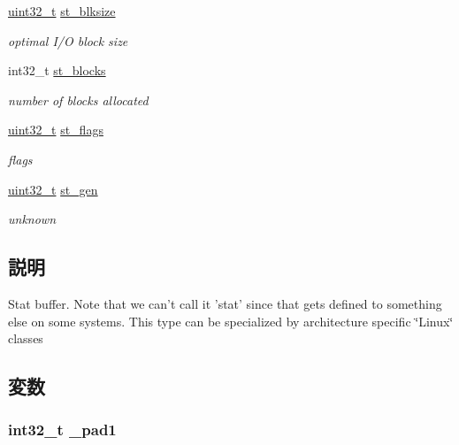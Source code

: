 \begin{DoxyCompactItemize}
\hyperlink{Type_8hh_a435d1572bf3f880d55459d9805097f62}{uint32\_\-t} \hyperlink{structLinux_1_1tgt__stat_a952cc52eb5efd16f9cebffe863823593}{st\_\-blksize}
\begin{DoxyCompactList}\small\item\em optimal I/O block size \item\end{DoxyCompactList}\item 
int32\_\-t \hyperlink{structLinux_1_1tgt__stat_a9bdc90ebe5192856e17c3ad67c0cb140}{st\_\-blocks}
\begin{DoxyCompactList}\small\item\em number of blocks allocated \item\end{DoxyCompactList}\item 
\hyperlink{Type_8hh_a435d1572bf3f880d55459d9805097f62}{uint32\_\-t} \hyperlink{structLinux_1_1tgt__stat_a2bac91973217293ac3be9cd5f402a819}{st\_\-flags}
\begin{DoxyCompactList}\small\item\em flags \item\end{DoxyCompactList}\item 
\hyperlink{Type_8hh_a435d1572bf3f880d55459d9805097f62}{uint32\_\-t} \hyperlink{structLinux_1_1tgt__stat_a5c579182b97b4e228d986b8b856d44ce}{st\_\-gen}
\begin{DoxyCompactList}\small\item\em unknown \item\end{DoxyCompactList}\end{DoxyCompactItemize}


\subsection{説明}
Stat buffer. Note that we can't call it 'stat' since that gets defined to something else on some systems. This type can be specialized by architecture specific \char`\"{}Linux\char`\"{} classes 

\subsection{変数}
\hypertarget{structLinux_1_1tgt__stat_a902f52ddee3e9cb51a33fb353723d79e}{
\subsubsection[{\_\-pad1}]{\setlength{\rightskip}{0pt plus 5cm}int32\_\-t {\bf \_\-pad1}}}
\label{structLinux_1_1tgt__stat_a902f52ddee3e9cb51a33fb353723d79e}



